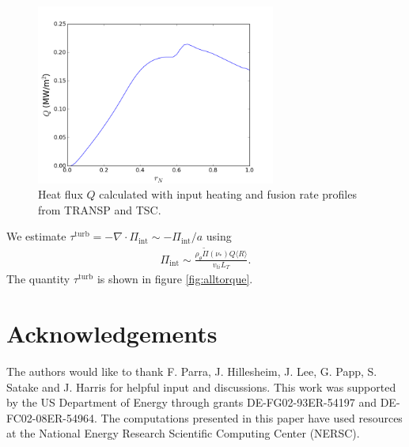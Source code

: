 \documentclass[aip, pop, preprint]{revtex4-1}
\numberwithin{figure}{section}
\numberwithin{equation}{section}
\begin{document}
\begin{figure}[h!]
\centering
\includegraphics[width=0.7\textwidth]{turbHeatFlux.png}
\caption{\label{fig:turbHeatFlux} Heat flux $Q$ calculated with input heating and fusion rate profiles from TRANSP and TSC.}
\end{figure}

We estimate $\tau^{\text{turb}} = - \nabla \cdot \Pi_{\text{int}} \sim -\Pi_{\text{int}}/a$ using 
\begin{gather}
\Pi_{\text{int}} \sim \frac{\rho_{\theta} \widetilde{\Pi}(\nu_*) Q \langle R \rangle}{v_{ti} L_T}.
\end{gather}
The quantity $\tau^{\text{turb}}$ is shown in figure \ref{fig:alltorque}.

\FloatBarrier

\section*{Acknowledgements}
The authors would like to thank F. Parra, J. Hillesheim, J. Lee, G. Papp, S. Satake and J. Harris for helpful input and discussions. This work was supported by the US Department of Energy through grants DE-FG02-93ER-54197 and DE-FC02-08ER-54964. The computations presented in this paper have used resources at the National Energy Research Scientific Computing Center (NERSC). 


\end{document}
